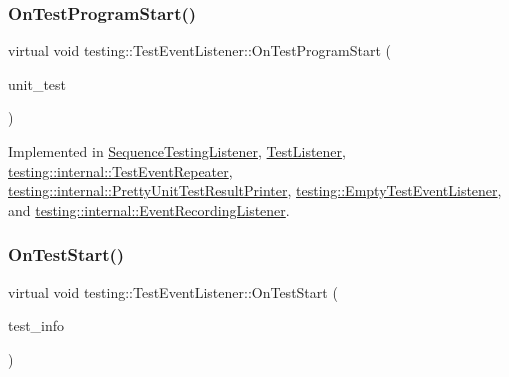 \subsubsection{\texorpdfstring{OnTestProgramStart()}{OnTestProgramStart()}}
{\footnotesize\ttfamily virtual void testing\+::\+Test\+Event\+Listener\+::\+On\+Test\+Program\+Start (\begin{DoxyParamCaption}\item[{const \mbox{\hyperlink{classtesting_1_1UnitTest}{Unit\+Test}} \&}]{unit\+\_\+test }\end{DoxyParamCaption})\hspace{0.3cm}{\ttfamily [pure virtual]}}



Implemented in \mbox{\hyperlink{classSequenceTestingListener_a25b96acdbaa6f582e583e6b56bd39b42}{Sequence\+Testing\+Listener}}, \mbox{\hyperlink{classTestListener_a6218f522f5b6b37050ff0ea630ac5fd3}{Test\+Listener}}, \mbox{\hyperlink{classtesting_1_1internal_1_1TestEventRepeater_a15ee2ff051063088d3a89a266d5ffcc4}{testing\+::internal\+::\+Test\+Event\+Repeater}}, \mbox{\hyperlink{classtesting_1_1internal_1_1PrettyUnitTestResultPrinter_a7a6b6de195b4ef3c9f2edd2e6c270f3e}{testing\+::internal\+::\+Pretty\+Unit\+Test\+Result\+Printer}}, \mbox{\hyperlink{classtesting_1_1EmptyTestEventListener_aa3847c8a3c22d8d69a6006dfdd6589fc}{testing\+::\+Empty\+Test\+Event\+Listener}}, and \mbox{\hyperlink{classtesting_1_1internal_1_1EventRecordingListener_aff89fdd3ae889a54a2ba2f3d4c98d3f6}{testing\+::internal\+::\+Event\+Recording\+Listener}}.

\mbox{\label{classtesting_1_1TestEventListener_ab4f6a0ca16ae75daf385b3b5914e1048}} 
\subsubsection{\texorpdfstring{OnTestStart()}{OnTestStart()}}
{\footnotesize\ttfamily virtual void testing\+::\+Test\+Event\+Listener\+::\+On\+Test\+Start (\begin{DoxyParamCaption}\item[{const \mbox{\hyperlink{classtesting_1_1TestInfo}{Test\+Info}} \&}]{test\+\_\+info }\end{DoxyParamCaption})\hspace{0.3cm}{\ttfamily [pure virtual]}}



